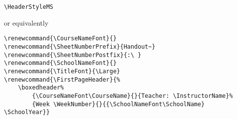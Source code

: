 \documentclass[12pt,twoside,parskip,notitle]{handout}
\begin{document}
\newpage

\begingroup
\HeaderStyleMS
\maketitle
\verb|\HeaderStyleMS|

or equivalently

\begin{verbatim}
\renewcommand{\CourseNameFont}{}
\renewcommand{\SheetNumberPrefix}{Handout~}
\renewcommand{\SheetNumberPostfix}{:\ }
\renewcommand{\SchoolNameFont}{}
\renewcommand{\TitleFont}{\Large}
\renewcommand{\FirstPageHeader}{%
    \boxedheader%
        {\CourseNameFont\CourseName}{}{Teacher: \InstructorName}%
        {Week \WeekNumber}{}{{\SchoolNameFont\SchoolName} \SchoolYear}}
\end{verbatim}
\endgroup
\end{document}
